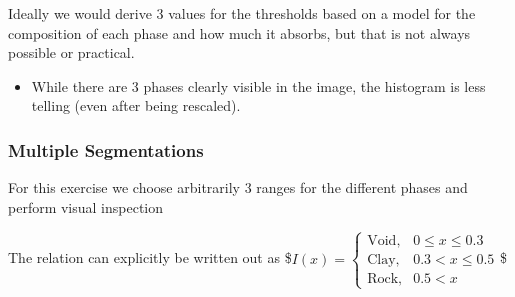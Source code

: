 \documentclass[letterpaper,10pt,english]{sphinxmanual}
\begin{document}
\noindent{}

\sphinxAtStartPar
Ideally we would derive 3 values for the thresholds based on a model for the composition of each phase and how much it absorbs, but that is not always possible or practical.
\begin{itemize}
\item {} 
\sphinxAtStartPar
While there are 3 phases clearly visible in the image, the histogram is less telling (even after being re\sphinxhyphen{}scaled).

\end{itemize}

\begin{sphinxVerbatim}[commandchars=\\\{\}]
 
\end{sphinxVerbatim}

\noindent{}


\subsubsection{Multiple Segmentations}
\label{\detokenize{04-BasicSegmentation_Part2:multiple-segmentations}}
\sphinxAtStartPar
For this exercise we choose arbitrarily 3 ranges for the different phases and perform visual inspection

\sphinxAtStartPar
The relation can explicitly be written out as
\$\( I(x) = 
\begin{cases}
\text{Void}, & 0 \leq x \leq 0.3  \\
\text{Clay}, & 0.3 < x \leq 0.5 \\
\text{Rock}, & 0.5 < x
\end{cases}\)\$
\end{document}
